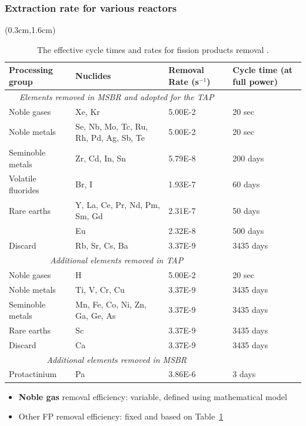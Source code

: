 \documentclass[9pt]{beamer}
\begin{document}
\begin{frame}
\frametitle{Extraction rate for various reactors}
\begin{textblock*}{12.5cm}(0.3cm,1.6cm) %
\begin{table}[htbp!]
\fontsize{6}{9}\selectfont
\centering
\caption{The effective cycle times and rates for fission products 
removal \cite{robertson_conceptual_1971, betzler_implementation_2017}.}
\vspace{-2mm}
\begin{tabular}{p{} p{} p{} 
p{}}
\hline 
\textbf{Processing group} & \qquad\qquad\qquad \textbf{Nuclides} & 
\textbf{Removal Rate (s$^{-1}$)} & \textbf{Cycle time (at full 
power)} 
\\ \hline 
\multicolumn{3}{c}{\textit{Elements removed in \gls{MSBR} and 
adopted for the \gls{TAP}} 
\cite{robertson_conceptual_1971}} \\
Noble gases & Xe, Kr								  & 5.00E-2 & 
20 
sec \\
Noble metals & Se, Nb, Mo, Tc, Ru, Rh, Pd, Ag, Sb, Te & 5.00E-2 & 
20 
sec \\
Seminoble metals & Zr, Cd, In, Sn	  				  & 5.79E-8 & 
200 
days\\
Volatile fluorides & Br, I 							  & 1.93E-7 & 
60 
days\\
Rare earths & Y, La, Ce, Pr, Nd, Pm, Sm, Gd           & 2.31E-7 & 
50 
days\\
\qquad & Eu & 2.32E-8 & 500 days \\
Discard & Rb, Sr, Cs, Ba & 3.37E-9 & 3435 days \\
\hline
\multicolumn{3}{c}{\textit{Additional elements removed in 
\gls{TAP}} 
\cite{betzler_implementation_2017, 
transatomic_power_corporation_neutronics_2016}} \\
Noble gases & H								  	& 5.00E-2 & 20 
sec    \\
Noble metals & Ti, V, Cr, Cu						& 3.37E-9 & 
3435 
days \\
Seminoble metals & Mn, Fe, Co, Ni, Zn, Ga, Ge, As   & 3.37E-9 & 
3435 
days \\
Rare earths & Sc									& 3.37E-9 & 
3435 
days \\
Discard & Ca										& 3.37E-9 & 
3435 
days \\
\hline
\multicolumn{3}{c}{\textit{Additional elements removed in 
\gls{MSBR}} 
\cite{robertson_conceptual_1971}} \\
Protactinium & Pa  	& 3.86E-6 & 3 days    \\
\hline
\end{tabular}
\label{tab:reprocessing_list}
\end{table}
\begin{itemize}
\item \textbf{Noble gas} removal efficiency: variable, defined using 
mathematical model
\item Other FP removal efficiency: fixed and based on 
Table~\ref{tab:reprocessing_list}
\end{itemize}
\end{textblock*}
\end{frame}
\end{document}
